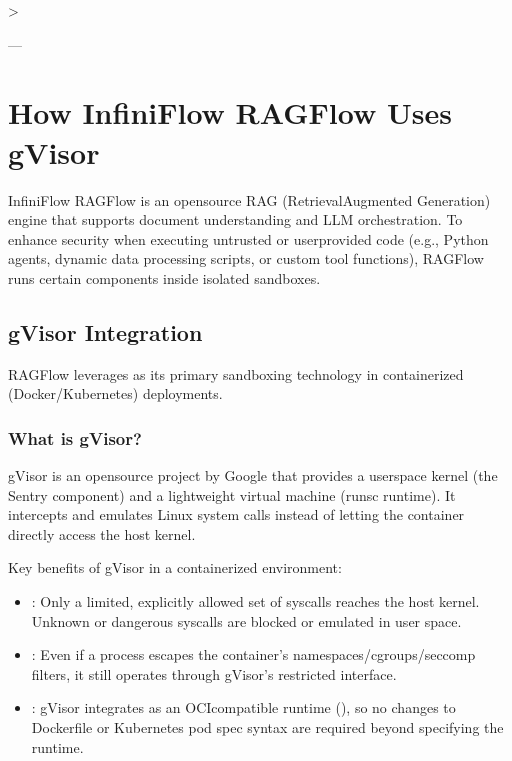 \documentclass[letterpaper,10pt,english]{sphinxmanual}
\begin{document}
\sphinxAtStartPar
\textgreater{} 

\sphinxAtStartPar
—

\sphinxstepscope


\chapter{How InfiniFlow RAGFlow Uses gVisor}
\label{\detokenize{gvisor:how-infiniflow-ragflow-uses-gvisor}}\label{\detokenize{gvisor::doc}}
\sphinxAtStartPar
InfiniFlow RAGFlow is an open\sphinxhyphen{}source RAG (Retrieval\sphinxhyphen{}Augmented Generation) engine that supports document understanding and LLM orchestration. To enhance security when executing untrusted or user\sphinxhyphen{}provided code (e.g., Python agents, dynamic data processing scripts, or custom tool functions), RAGFlow runs certain components inside isolated sandboxes.


\section{gVisor Integration}
\label{\detokenize{gvisor:gvisor-integration}}
\sphinxAtStartPar
RAGFlow leverages  as its primary sandboxing technology in containerized (Docker/Kubernetes) deployments.


\subsection{What is gVisor?}
\label{\detokenize{gvisor:what-is-gvisor}}
\sphinxAtStartPar
gVisor is an open\sphinxhyphen{}source project by Google that provides a user\sphinxhyphen{}space kernel (the Sentry component) and a lightweight virtual machine (runsc runtime). It intercepts and emulates Linux system calls instead of letting the container directly access the host kernel.

\sphinxAtStartPar
Key benefits of gVisor in a containerized environment:
\begin{itemize}
\item {} 
\sphinxAtStartPar
{}: Only a limited, explicitly allowed set of syscalls reaches the host kernel. Unknown or dangerous syscalls are blocked or emulated in user space.

\item {} 
\sphinxAtStartPar
{}: Even if a process escapes the container’s namespaces/cgroups/seccomp filters, it still operates through gVisor’s restricted interface.

\item {} 
\sphinxAtStartPar
{}: gVisor integrates as an OCI\sphinxhyphen{}compatible runtime (), so no changes to Dockerfile or Kubernetes pod spec syntax are required beyond specifying the runtime.

\end{itemize}
\end{document}

